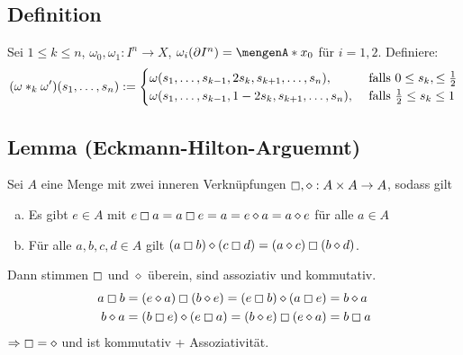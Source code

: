 \subsection{Definition} %
\label{sub:144}
Sei $1 \le k \le n$, $\omega_0, \omega_1 : I^n \to X$, $\omega_i(\partial I^n) = \set{x_0}$ für $i=1,2$. Definiere:
\[
	\enbrace*{\omega *_k \omega'} (s_1, \ldots , s_n) := \begin{cases}
		\omega(s_1, \ldots , s_{k-1}, 2 s_k, s_{k+1}, \ldots , s_n), &\text{ falls } 0 \le s_k, \le \frac{1}{2} \\
		\omega(s_1, \ldots , s_{k-1}, 1- 2 s_k, s_{k+1}, \ldots , s_n), &\text{ falls } \frac{1}{2} \le s_k \le 1 
	\end{cases} 
\]

\subsection{Lemma (Eckmann-Hilton-Arguemnt)} %
\label{sub:145}
Sei $A$ eine Menge mit zwei inneren Verknüpfungen $\boxempty, \diamond : A \times A\to A $, sodass gilt 
\begin{enumerate}[a)]
	\item Es gibt $e \in A$ mit $e \boxempty a = a \boxempty e = a = e \diamond a = a \diamond e$ für alle $a \in A$
	\item Für alle $a,b,c,d \in A$ gilt $(a \boxempty b) \diamond (c \boxempty d) = (a \diamond c) \boxempty (b \diamond d)$.
\end{enumerate}
Dann stimmen $\boxempty$ und $\diamond $ überein, sind assoziativ und kommutativ.
\begin{align*}
	a \boxempty b &= (e \diamond a) \boxempty (b \diamond e) = (e \boxempty b) \diamond (a \boxempty e) = b \diamond a \\
	b \diamond a &= (b \boxempty e) \diamond (e \boxempty a) = (b \diamond e) \boxempty (e \diamond a) = b \boxempty a
\end{align*}
$\Rightarrow \boxempty = \diamond$ und ist kommutativ + Assoziativität. \bewende

